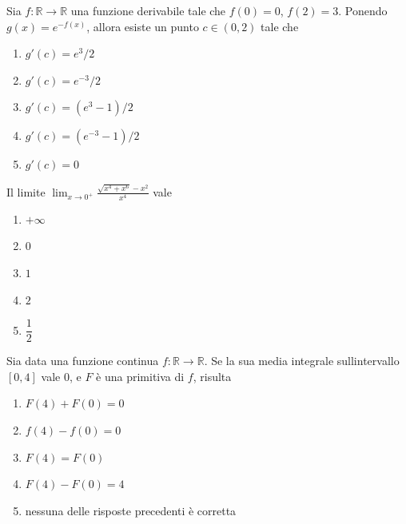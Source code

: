 \begin{quiz}
Sia $f:\mathbb R\to\mathbb R$ una funzione derivabile tale che $f(0)=0$, $f(2)=3$. Ponendo $g(x)=e^{-f(x)}$, allora esiste un punto $c\in(0,2)$ tale che
\begin{enumerate}
\item $g\prime(c)=e^3/2$
\item $g\prime(c)=e^{-3}/2$
\item $g\prime(c)=(e^3-1)/2$
\item $g\prime(c)=(e^{-3}-1)/2$
\item $g\prime(c)=0$
\end{enumerate}
\end{quiz}

\begin{quiz}
Il limite $\displaystyle\lim_{x\to0^+}\frac{\sqrt{x^4+x^6}-x^2}{x^4}$ vale
\begin{enumerate}
\item $+\infty$
\item $0$
\item $1$
\item $2$
\item $\dfrac12$
\end{enumerate}
\end{quiz}

\begin{quiz}
Sia data una funzione continua $f:\mathbb R\to\mathbb R$. Se la sua media integrale sull\textquotesingle intervallo $[0,4]$ vale $0$, e $F$ \`e una primitiva di $f$, risulta
\begin{enumerate}
\item $F(4)+F(0)=0$
\item $f(4)-f(0)=0$
\item $F(4)=F(0)$
\item $F(4)-F(0)=4$
\item nessuna delle risposte precedenti \`e corretta
\end{enumerate}
\end{quiz}

